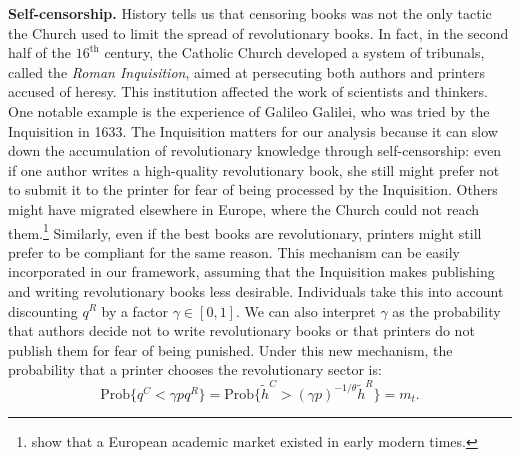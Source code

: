 \textbf{Self-censorship.} History tells us that censoring books was not the only tactic the Church used to limit the spread of revolutionary books. In fact, in the second half of the $16^{\text{th}}$ century, the Catholic Church developed a system of tribunals, called the \textit{Roman Inquisition}, aimed at persecuting both authors and printers accused of heresy. This institution affected the work of scientists and thinkers. One notable example is the experience of Galileo Galilei, who was tried by the Inquisition in 1633. The Inquisition matters for our analysis because it can slow down the accumulation of revolutionary knowledge through self-censorship: even if one author writes a high-quality revolutionary book, she still might prefer not to submit it to the printer for fear of being processed by the Inquisition. Others might have migrated elsewhere in Europe, where the Church could not reach them.\footnote{ show that a European academic market existed in early modern times.} Similarly, even if the best books are revolutionary, printers might still prefer to be compliant for the same reason. This mechanism can be easily incorporated in our framework, assuming that the Inquisition makes publishing and writing revolutionary books less desirable. Individuals take this into account discounting $q^R$ by a factor $\gamma\in[0,1]$. We can also interpret $\gamma$ as the probability that authors decide not to write revolutionary books or that printers do not publish them for fear of being punished. Under this new mechanism, the probability that a printer chooses the revolutionary sector is:
\begin{equation}\label{eq:censorhip2}
	\text{Prob}\{q^C<\gamma p q^R\}=\text{Prob}\{\tilde{h}^C>(\gamma p)^{-1/\theta}\tilde{h}^R\}=m_t.
\end{equation}

